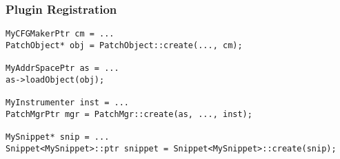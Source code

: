 \subsubsection{Plugin Registration}
\lstset{numbers=none}
\begin{lstlisting}
MyCFGMakerPtr cm = ...
PatchObject* obj = PatchObject::create(..., cm);

MyAddrSpacePtr as = ...
as->loadObject(obj);

MyInstrumenter inst = ...
PatchMgrPtr mgr = PatchMgr::create(as, ..., inst);

MySnippet* snip = ...
Snippet<MySnippet>::ptr snippet = Snippet<MySnippet>::create(snip);
\end{lstlisting}
